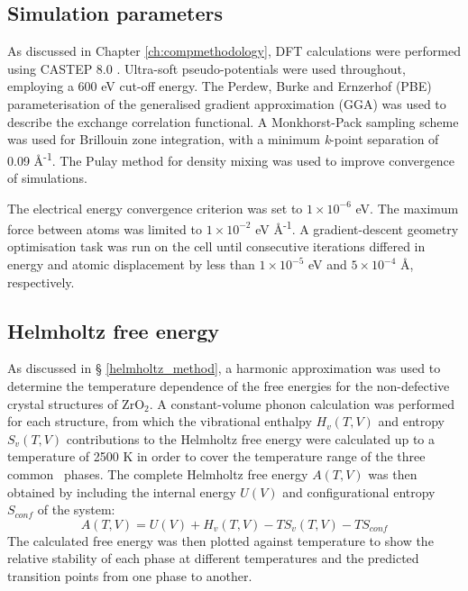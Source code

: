 \subsection{Simulation parameters}

As discussed in Chapter \ref{ch:compmethodology}, DFT calculations were performed using CASTEP 8.0 \cite{Clark2005}. Ultra-soft pseudo-potentials were used throughout, employing a 600 eV cut-off energy. The Perdew, Burke and Ernzerhof (PBE) \cite{Perdew1996} parameterisation of the generalised gradient approximation (GGA) was used to describe the exchange correlation functional. A Monkhorst-Pack sampling scheme \cite{Monkhorst1976} was used for Brillouin zone integration, with a minimum \emph{k}-point separation of 0.09 \r{A}\textsuperscript{-1}. The Pulay method for density mixing \cite{Pulay1980} was used to improve convergence of simulations. 

The electrical energy convergence criterion was set to $1\times10^{-6} $ eV. The maximum force between atoms was limited to $1\times10^{-2}$ eV \r{A}\textsuperscript{-1}. A gradient-descent geometry optimisation task was run on the cell until consecutive iterations differed in energy and atomic displacement by less than $1\times10^{-5}$ eV and $5\times10^{-4}$ \r{A}, respectively. 

\subsection{Helmholtz free energy}

As discussed in § \ref{helmholtz_method}, a harmonic approximation was used to determine the temperature dependence of the free energies for the non-defective crystal structures of ZrO$_{2}$. A constant-volume phonon calculation was performed for each structure, from which the vibrational enthalpy $H_{v}(T, V)$ and entropy $S_{v}(T, V)$ contributions to the Helmholtz free energy were calculated up to a temperature of 2500 K in order to cover the temperature range of the three common \zirconia\ phases. The complete Helmholtz free energy $A(T, V)$ was then obtained by including the internal energy $U(V)$ and configurational entropy $S_{conf}$ of the system:
\begin{equation} \label{helmholtz_equation}
A(T, V) = U(V) + H_{v}(T, V) - TS_{v}(T, V) - TS_{conf}
\end{equation}
The calculated free energy was then plotted against temperature to show the relative stability of each phase at different temperatures and the predicted transition points from one phase to another. 

